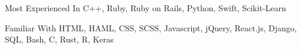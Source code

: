 


\begin{cvskills}


  \cvskill
  {Most Experienced In}
  {C++, Ruby, Ruby on Rails, Python, Swift, Scikit-Learn}


  \cvskill
  {Familiar With}
  {HTML, HAML, CSS, SCSS, Javascript, jQuery, React.js, Django, SQL, Bash, C, Rust, R, Keras}




\end{cvskills}
